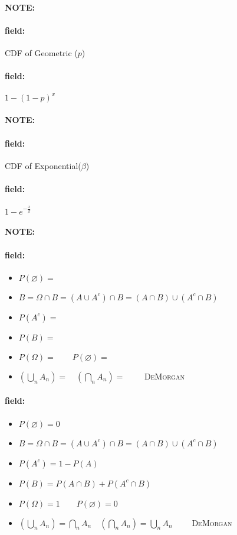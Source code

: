 \documentclass[12pt]{article}
\newenvironment{note}{\paragraph{NOTE:}}{}
\newenvironment{field}{\paragraph{field:}}{}
\begin{document}

\begin{note}
  \begin{field}
    CDF of Geometric ($p$)
  \end{field}
  \begin{field}
    $1 - (1-p)^x$
  \end{field}
\end{note}


\begin{note}
  \begin{field}
    CDF of Exponential($\beta$)
  \end{field}
  \begin{field}
    $1 - e^{-\frac{x}{\beta}}$
  \end{field}
\end{note}

\begin{note}
  \begin{field}
    \begin{itemize}
  \item $P(\varnothing) = $
  \item $B = \Omega \cap B = (A \cup A^c) \cap B
    = (A \cap B) \cup (A^c \cap B)$
  \item $P(A^c) = $
  \item $P(B) = $
  \item $P(\Omega) =  \qquad P(\varnothing) = $
  \item $\left(\bigcup_n A_n\right) =
    \quad
    \left(\bigcap_n A_n\right) =
    \qquad$
    \textsc{DeMorgan}
\end{itemize}
  \end{field}
  \begin{field}
    \begin{itemize}
  \item $P(\varnothing) = 0$
  \item $B = \Omega \cap B = (A \cup A^c) \cap B
    = (A \cap B) \cup (A^c \cap B)$
  \item $P(A^c) = 1 - P(A)$
  \item $P(B) = P(A \cap B) + P(A^c \cap B)$
  \item $P(\Omega) = 1 \qquad P(\varnothing) = 0$
  \item $\left(\bigcup_n A_n\right) = \bigcap_n A_n
    \quad
    \left(\bigcap_n A_n\right) = \bigcup_n A_n
    \qquad$
    \textsc{DeMorgan}
\end{itemize}
  \end{field}
\end{note}
\end{document}
